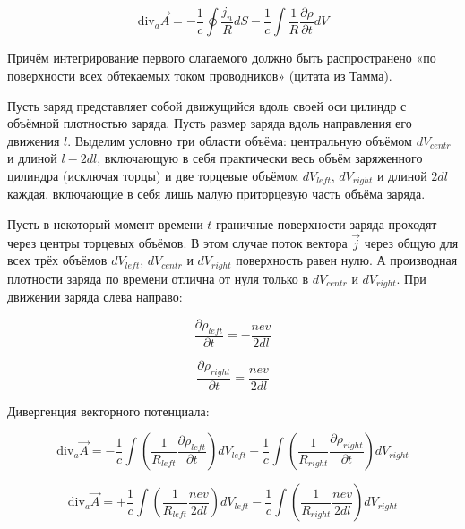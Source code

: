 \documentclass[12pt, a4paper]{article}
\begin{document}
\begin{equation}
\text{div}_a \vec{A} = -\frac{1}{c} \oint \frac{j_n}{R} dS - \frac{1}{c} \int \frac{1}{R} \frac{\partial \rho}{\partial t} dV
\label{eq:div_A_gauss}
\end{equation}

Причём интегрирование первого слагаемого должно быть распространено «по поверхности всех обтекаемых током проводников» (цитата из Тамма).

Пусть заряд представляет собой движущийся вдоль своей оси цилиндр с объёмной плотностью заряда. Пусть размер заряда вдоль направления его движения $l$. Выделим условно три области объёма: центральную объёмом $dV_{centr}$ и длиной $l - 2dl$, включающую в себя практически весь объём заряженного цилиндра (исключая торцы) и две торцевые объёмом $dV_{left}$, $dV_{right}$ и длиной $2dl$ каждая, включающие в себя лишь малую приторцевую часть объёма заряда.

Пусть в некоторый момент времени $t$ граничные поверхности заряда проходят через центры торцевых объёмов. В этом случае поток вектора $\vec{j}$ через общую для всех трёх объёмов $dV_{left}$, $dV_{centr}$ и $dV_{right}$ поверхность равен нулю. А производная плотности заряда по времени отлична от нуля только в $dV_{centr}$ и $dV_{right}$. При движении заряда слева направо:

\begin{equation}
\frac{\partial \rho_{left}}{\partial t} = -\frac{nev}{2dl}
\label{eq:rho_left}
\end{equation}

\begin{equation}
\frac{\partial \rho_{right}}{\partial t} = \frac{nev}{2dl}
\label{eq:rho_right}
\end{equation}

Дивергенция векторного потенциала:

\begin{equation}
\text{div}_a \vec{A} = -\frac{1}{c} \int \left( \frac{1}{R_{left}} \frac{\partial \rho_{left}}{\partial t} \right) dV_{left} - \frac{1}{c} \int \left( \frac{1}{R_{right}} \frac{\partial \rho_{right}}{\partial t} \right) dV_{right}
\label{eq:div_A_cylinder}
\end{equation}

\begin{equation}
\text{div}_a \vec{A} = +\frac{1}{c} \int \left( \frac{1}{R_{left}} \frac{nev}{2dl} \right) dV_{left} - \frac{1}{c} \int \left( \frac{1}{R_{right}} \frac{nev}{2dl} \right) dV_{right}
\label{eq:div_A_cylinder_expanded}
\end{equation}
\end{document}
